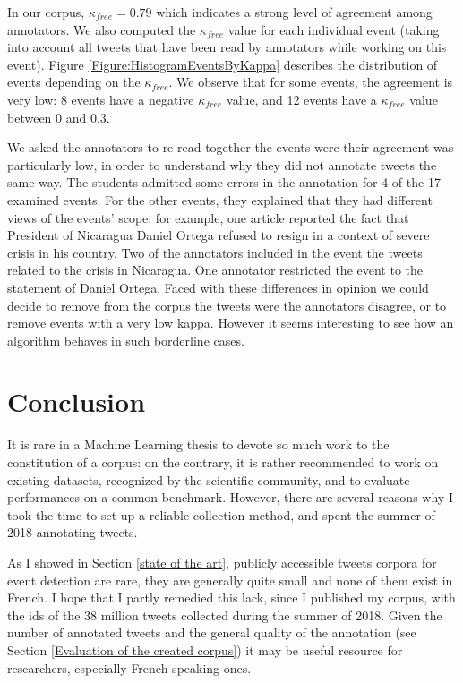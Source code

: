 In our corpus, $\kappa_{free} = 0.79$ which indicates a strong level of agreement among annotators. We also computed the $\kappa_{free}$ value for  each individual event (taking into account all tweets that have been read by annotators while working on this event). Figure \ref{Figure:HistogramEventsByKappa} describes the distribution of events depending on the $\kappa_{free}$. We observe that for some events, the agreement is very low: 8 events have a negative $\kappa_{free}$ value, and 12 events have a $\kappa_{free}$ value between 0 and 0.3.


We asked the annotators to re-read together the events were their agreement was particularly low, in order to understand why they did not annotate tweets the same way. The students admitted some errors in the annotation for 4 of the 17 examined events. For the other events, they explained that they had different views of the events' scope: for example, one article reported the fact that President of Nicaragua Daniel Ortega refused to resign in a context of severe crisis in his country. Two of the annotators included in the event the tweets related to the crisis in Nicaragua. One annotator restricted the event to the statement of Daniel Ortega. Faced with these differences in opinion we could decide to remove from the corpus the tweets were the annotators disagree, or to remove events with a very low kappa. However it seems interesting to see how an algorithm behaves in such borderline cases.


\section{Conclusion}

It is rare in a Machine Learning thesis to devote so much work to the constitution of a corpus: on the contrary, it is rather recommended to work on existing datasets, recognized by the scientific community, and to evaluate  performances on a common benchmark. However, there are several reasons why I took the time to set up a reliable collection method, and spent the summer of 2018 annotating tweets. 

As I showed in Section \ref{state of the art}, publicly accessible tweets corpora for event detection are rare, they are generally quite small and none of them exist in French. I hope that I partly remedied this lack, since I published my corpus, with the ids of the 38 million tweets collected during the summer of 2018. Given the number of annotated tweets and the general quality of the annotation (see Section \ref{Evaluation of the created corpus}) it may be useful resource for researchers, especially French-speaking ones.


